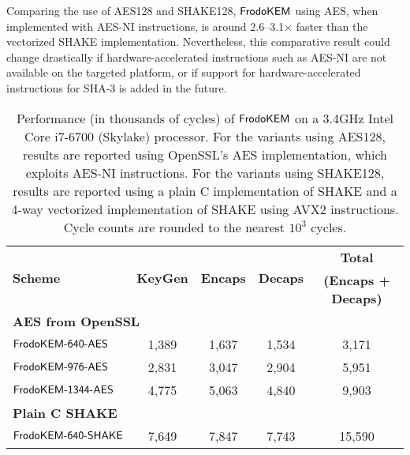 \documentclass{iacrcc}
\begin{document}
Comparing the use of AES128 and SHAKE128, $\textsf{\upshape\mdseries FrodoKEM}$ using AES, when implemented with AES-NI instructions,
is around 2.6--3.1$\times$ faster than the vectorized SHAKE implementation. Nevertheless, this comparative
result could change drastically if hardware-accelerated instructions such as AES-NI are not available on the
targeted platform, or if support for hardware-accelerated instructions for SHA-3 is added in the future. 

\begin{table}[t]
\caption{Performance (in thousands of cycles) of $\textsf{\upshape\mdseries FrodoKEM}$ on a 3.4GHz Intel Core i7-6700 (Skylake) processor.
For the variants using AES128, results are reported using OpenSSL's AES implementation, which exploits AES-NI instructions. 
For the variants using SHAKE128, results are reported using a plain C implementation of SHAKE and a 4-way vectorized
implementation of SHAKE using AVX2 instructions.
Cycle counts are rounded to the nearest $10^3$ cycles.}\label{tab:results_x64}
\medskip
\centering
\renewcommand{\tabcolsep}{0.25cm}
\renewcommand{\arraystretch}{1.1}
\begin{tabular}{l|c c c|c}
\toprule
\multirow{2}{*}{\textbf{Scheme}}     &     \multirow{2}{*}{\textbf{KeyGen}}      &    \multirow{2}{*}{\textbf{Encaps}}   &    \multirow{2}{*}{\textbf{Decaps}}   &    \textbf{Total}        \\ 
                                   &                                             &                                       &
                                   &    \textbf{(Encaps + Decaps)}   \\
\midrule
\multicolumn{5}{l}{\bf AES from OpenSSL} \\
\midrule
$\textsf{\upshape\mdseries FrodoKEM-640-AES}$                               &            1,389                &            1,637                   &                 1,534         &                3,171             \\
$\textsf{\upshape\mdseries FrodoKEM-976-AES}$                             &            2,831                &            3,047                   &                 2,904       &                5,951             \\
$\textsf{\upshape\mdseries FrodoKEM-1344-AES}$                             &            4,775                &            5,063                   &                 4,840       &                 9,903             \\
\midrule
\multicolumn{5}{l}{\bf Plain C SHAKE} \\
\midrule
$\textsf{\upshape\mdseries FrodoKEM-640-SHAKE}$            &           7,649                  &           7,847                  &                7,743             &              15,590        \\

\end{tabular}
\end{table}
\end{document}
